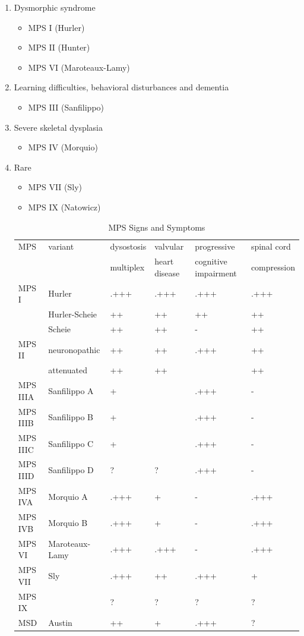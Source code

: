\documentclass[12pt]{scrartcl}
\begin{document}
\begin{enumerate}
\item Dysmorphic syndrome
\label{sec:org5a619c1}
\begin{itemize}
\item MPS I (Hurler)
\item MPS II (Hunter)
\item MPS VI (Maroteaux-Lamy)
\end{itemize}
\item Learning difficulties, behavioral disturbances and dementia
\label{sec:orga8b65fb}
\begin{itemize}
\item MPS III (Sanfilippo)
\end{itemize}
\item Severe skeletal dysplasia
\label{sec:org3e681b9}
\begin{itemize}
\item MPS IV (Morquio)
\end{itemize}
\item Rare
\label{sec:org524fd28}
\begin{itemize}
\item MPS VII (Sly)
\item MPS IX (Natowicz)
\end{itemize}

\begin{table}[htbp]
\caption{\label{tab:org315c405}MPS Signs and Symptoms}
\centering
\begin{tabular}{llllll}
MPS & variant & dysostosis & valvular & progressive & spinal cord\\
 &  & multiplex & heart disease & cognitive impairment & compression\\
\hline
MPS I & Hurler & .+++ & .+++ & .+++ & .+++\\
 & Hurler-Scheie & ++ & ++ & ++ & ++\\
 & Scheie & ++ & ++ & - & ++\\
\hline
MPS II & neuronopathic & ++ & ++ & .+++ & ++\\
 & attenuated & ++ & ++ & \textpm{} & ++\\
\hline
MPS IIIA & Sanfilippo A & + & \textpm{} & .+++ & -\\
MPS IIIB & Sanfilippo B & + & \textpm{} & .+++ & -\\
MPS IIIC & Sanfilippo C & + & \textpm{} & .+++ & -\\
MPS IIID & Sanfilippo D & ? & ? & .+++ & -\\
\hline
MPS IVA & Morquio A & .+++ & + & - & .+++\\
MPS IVB & Morquio B & .+++ & + & - & .+++\\
\hline
MPS VI & Maroteaux-Lamy & .+++ & .+++ & - & .+++\\
MPS VII & Sly & .+++ & ++ & .+++ & +\\
MPS IX &  & ? & ? & ? & ?\\
MSD & Austin & ++ & + & .+++ & ?\\
\end{tabular}
\end{table}
\end{enumerate}
\end{document}
